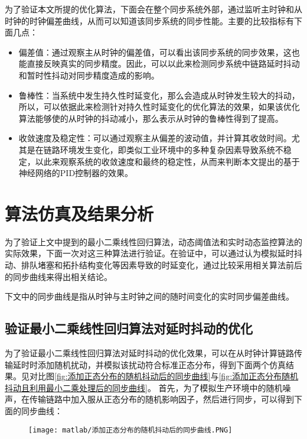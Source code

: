 为了验证本文所提的优化算法，下面会在整个同步系统外部，通过监听主时钟和从时钟的时钟偏差曲线，从而可以知道该同步系统的同步性能。主要的比较指标有下面几点：
\begin{itemize}[noitemsep,topsep=0pt,parsep=0pt,partopsep=0pt]
  \item 偏差值：通过观察主从时钟的偏差值，可以看出该同步系统的同步效果，这也能直接反映真实的同步精度。因此，可以以此来检测同步系统中链路延时抖动和暂时性抖动对同步精度造成的影响。
  \item 鲁棒性：当系统中发生持久性时延变化，那么会造成从时钟发生较大的抖动，所以，可以依据此来检测针对持久性时延变化的优化算法的效果，如果该优化算法能够使的从时钟的抖动减小，那么表示从时钟的鲁棒性得到了提高。
  \item 收敛速度及稳定性：可以通过观察主从偏差的波动值，并计算其收敛时间。尤其是在链路环境发生变化，即类似工业环境中的多种复杂因素导致系统不稳定，以此来观察系统的收敛速度和最终的稳定性，从而来判断本文提出的基于神经网络的PID控制器的效果。
\end{itemize}

\section{算法仿真及结果分析}
为了验证上文中提到的最小二乘线性回归算法，动态阈值法和实时动态监控算法的实际效果，下面一次对这三种算法进行验证。在验证中，可以通过认为模拟延时抖动、排队堵塞和拓扑结构变化等因素导致的时延变化，通过比较采用相关算法前后的同步曲线来得出相关结论。

下文中的同步曲线是指从时钟与主时钟之间的随时间变化的实时同步偏差曲线。

\subsection{验证最小二乘线性回归算法对延时抖动的优化}
为了验证最小二乘线性回归算法对延时抖动的优化效果，可以在从时钟计算链路传输延时时添加随机扰动，并模拟该扰动符合标准正态分布，得到下面两个仿真结果。见对比图\ref{fig:添加正态分布的随机抖动后的同步曲线}与\ref{fig:添加正态分布随机抖动且利用最小二乘处理后的同步曲线}。
首先，为了模拟生产环境中的随机噪声，在传输链路中加入服从正态分布的随机影响因子，然后进行同步，可以得到下面的同步曲线：
\begin{figure}[!hbp]
  \centering
  \begin{minipage}[b]{1\textwidth}
    \captionstyle{\centering}
    \centering
    \texttt{[image: matlab/添加正态分布的随机抖动后的同步曲线.PNG]}
  \end{minipage}     
\end{figure}

